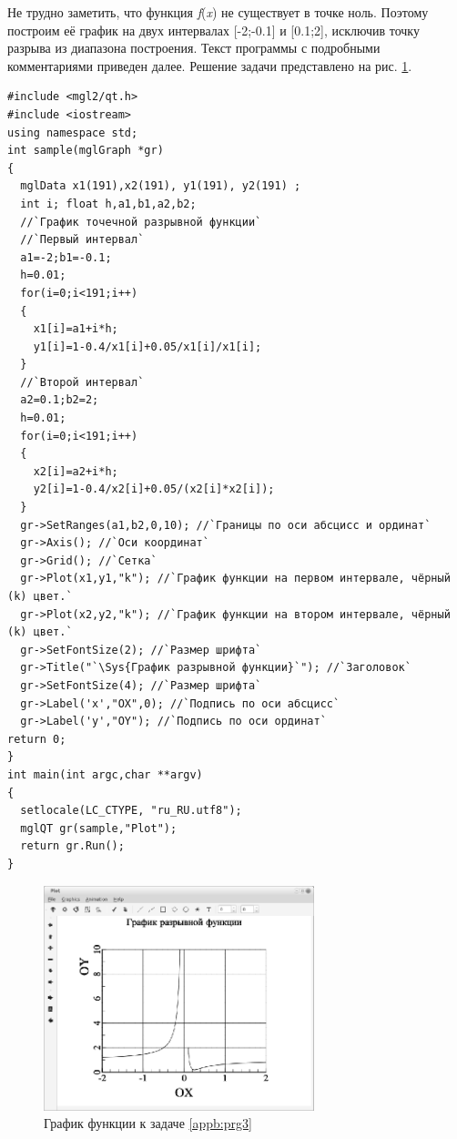 
Не трудно заметить, что функция \emph{f}(\emph{x}) не существует в точке ноль. Поэтому
построим её график на двух интервалах [-2;-0.1] и [0.1;2], исключив точку разрыва из диапазона построения. Текст
программы с подробными комментариями приведен далее. Решение задачи представлено на рис. \ref{appb:refDrawing4}.
\begin{lstlisting}
#include <mgl2/qt.h>
#include <iostream>
using namespace std;
int sample(mglGraph *gr)
{  
  mglData x1(191),x2(191), y1(191), y2(191) ;
  int i; float h,a1,b1,a2,b2;
  //`График точечной разрывной функции`
  //`Первый интервал`
  a1=-2;b1=-0.1;
  h=0.01;
  for(i=0;i<191;i++)
  {
    x1[i]=a1+i*h;
    y1[i]=1-0.4/x1[i]+0.05/x1[i]/x1[i];
  }
  //`Второй интервал`
  a2=0.1;b2=2;
  h=0.01;
  for(i=0;i<191;i++)
  {
    x2[i]=a2+i*h;
    y2[i]=1-0.4/x2[i]+0.05/(x2[i]*x2[i]);
  }
  gr->SetRanges(a1,b2,0,10); //`Границы по оси абсцисс и ординат`
  gr->Axis(); //`Оси координат`
  gr->Grid(); //`Сетка`
  gr->Plot(x1,y1,"k"); //`График функции на первом интервале, чёрный (k) цвет.`
  gr->Plot(x2,y2,"k"); //`График функции на втором интервале, чёрный (k) цвет.`
  gr->SetFontSize(2); //`Размер шрифта`
  gr->Title("`\Sys{График разрывной функции}`"); //`Заголовок`
  gr->SetFontSize(4); //`Размер шрифта`
  gr->Label('x',"OX",0); //`Подпись по оси абсцисс`
  gr->Label('y',"OY"); //`Подпись по оси ординат`
return 0;
}
int main(int argc,char **argv)
{
  setlocale(LC_CTYPE, "ru_RU.utf8");
  mglQT gr(sample,"Plot");
  return gr.Run();
}
\end{lstlisting}

\begin{figure}[htb]
\begin{center}
\includegraphics[width=0.7\textwidth]{img/ris_appb_5}
\caption{График функции к задаче \ref{appb:prg3}}
\label{appb:refDrawing4}
\end{center}
\end{figure}


